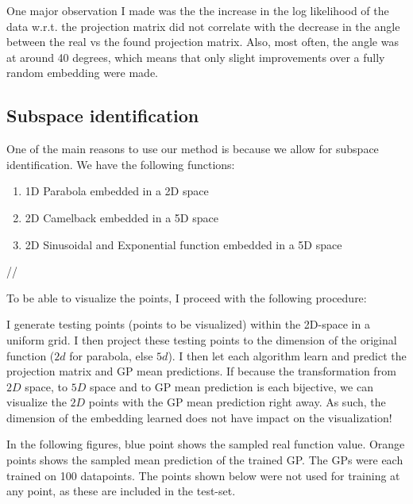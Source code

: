  One major observation I made was the the increase in the log likelihood of the data w.r.t. the projection matrix did not correlate with the decrease in the angle between the real vs the found projection matrix.
 Also, most often, the angle was at around 40 degrees, which means that only slight improvements over a fully random embedding were made.


\subsection{Subspace identification}
One of the main reasons to use our method is because we allow for subspace identification.
We have the following functions:

\begin{enumerate}
\item 1D Parabola embedded in a 2D space
\item 2D Camelback embedded in a 5D space
\item 2D Sinusoidal and Exponential function embedded in a 5D space
\end{enumerate} //

To be able to visualize the points, I proceed with the following procedure:

I generate testing points (points to be visualized) within the 2D-space in a uniform grid.
I then project these testing points to the dimension of the original function ($2d$ for parabola, else $5d$).
I then let each algorithm learn and predict the projection matrix and GP mean predictions.
If because the transformation from $2D$ space, to $5D$ space and to GP mean prediction is each bijective, we can visualize the $2D$ points with the GP mean prediction right away.
As such, the dimension of the embedding learned does not have impact on the visualization!

In the following figures, blue point shows the sampled real function value.
Orange points shows the sampled mean prediction of the trained GP.
The GPs were each trained on 100 datapoints. 
The points shown below were not used for training at any point, as these are included in the test-set.

